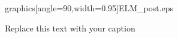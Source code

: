 \documentclass[apjl]{emulateapj}
\begin{document}
\begin{figure}[h!]
\begin{center}
graphics[angle=90,width=0.95\textwidth]{ELM_post.eps}
\caption{Replace this text with your caption}
\label{fig:ELM_post}
\end{center}
\end{figure}
\end{document}
